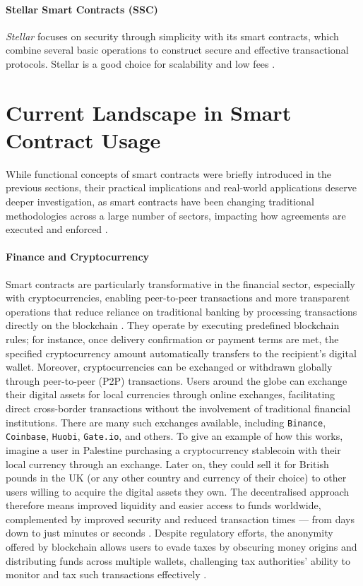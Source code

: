 \paragraph{Stellar Smart Contracts (SSC)}

\textit{Stellar} focuses on security through simplicity with its smart contracts, which combine several basic operations to construct secure and effective transactional protocols. Stellar is a good choice for scalability and low fees \cite{MokdadEtAl2022}.

\section{Current Landscape in Smart Contract Usage}

While functional concepts of smart contracts were briefly introduced in the previous sections, their practical implications and real-world applications deserve deeper investigation, as smart contracts have been changing traditional methodologies across a large number of sectors, impacting how agreements are executed and enforced \cite{MagazzeniEtAl2017}.

\paragraph{Finance and Cryptocurrency}

Smart contracts are particularly transformative in the financial sector, especially with cryptocurrencies, enabling peer-to-peer transactions and more transparent operations that reduce reliance on traditional banking \cite{AlmahirahEtAl2021, MagazzeniEtAl2017} by processing transactions directly on the blockchain \cite{Smith2020}. They operate by executing predefined blockchain rules; for instance, once delivery confirmation or payment terms are met, the specified cryptocurrency amount automatically transfers to the recipient’s digital wallet. Moreover, cryptocurrencies can be exchanged or withdrawn globally through peer-to-peer (P2P) transactions. Users around the globe can exchange their digital assets for local currencies through online exchanges, facilitating direct cross-border transactions without the involvement of traditional financial institutions. There are many such exchanges available, including \texttt{Binance}, \texttt{Coinbase}, \texttt{Huobi}, \texttt{Gate.io}, and others. To give an example of how this works, imagine a user in Palestine purchasing a cryptocurrency stablecoin with their local currency through an exchange. Later on, they could sell it for British pounds in the UK (or any other country and currency of their choice) to other users willing to acquire the digital assets they own. The decentralised approach therefore means improved liquidity and easier access to funds worldwide, complemented by improved security and reduced transaction times — from days down to just minutes or seconds \cite{DelgadoSeguraEtAl2018}. Despite regulatory efforts, the anonymity offered by blockchain allows users to evade taxes by obscuring money origins and distributing funds across multiple wallets, challenging tax authorities’ ability to monitor and tax such transactions effectively \cite{CongEtAl2023}.

